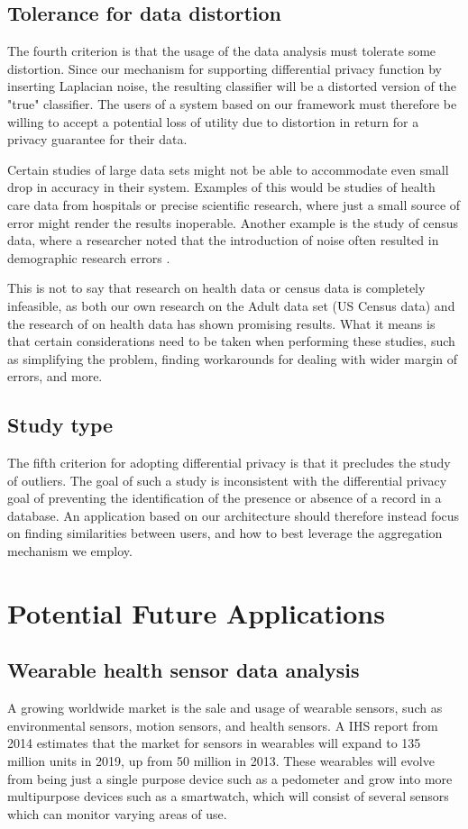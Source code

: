 \subsection{Tolerance for data distortion}
The fourth criterion is that the usage of the data analysis must tolerate some distortion. Since our mechanism for supporting differential privacy function by inserting Laplacian noise, the resulting classifier will be a distorted version of the "true" classifier. The users of a system based on our framework must therefore be willing to accept a potential loss of utility due to distortion in return for a privacy guarantee for their data. 

Certain studies of large data sets might not be able to accommodate even small drop in accuracy in their system. Examples of this would be studies of health care data from hospitals or precise scientific research, where just a small source of error might render the results inoperable. Another example is the study of census data, where a researcher noted that the introduction of noise often resulted in demographic research errors \citep{yakowitz2011tragedy}. 

This is not to say that research on health data or census data is completely infeasible, as both our own research on the Adult data set (US Census data) and the research of \cite{ji2014DisLogReg} on health data has shown promising results. What it means is that certain considerations need to be taken when performing these studies, such as simplifying the problem, finding workarounds for dealing with wider margin of errors, and more. 

\subsection{Study type}
The fifth criterion for adopting differential privacy is that it precludes the study of outliers. The goal of such a study is inconsistent with the differential privacy goal of preventing the identification of the presence or absence of a record in a database. An application based on our architecture should therefore instead focus on finding similarities between users, and how to best leverage the aggregation mechanism we employ. 


\section{Potential Future Applications}
\subsection{Wearable health sensor data analysis }
A growing worldwide market is the sale and usage of wearable sensors, such as environmental sensors, motion sensors, and health sensors. A IHS report \citep{ihs2014reportwearables} from 2014 estimates that the market for sensors in wearables will expand to 135 million units in 2019, up from 50 million in 2013. These wearables will evolve from being just a single purpose device such as a pedometer and grow into more multipurpose devices such as a smartwatch, which will consist of several sensors which can monitor varying areas of use. 


